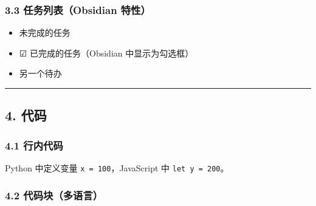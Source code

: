 \subsubsection{3.3 任务列表（Obsidian
特性）}\label{ux4efbux52a1ux5217ux8868obsidian-ux7279ux6027}

\begin{itemize}
\tightlist
\item[$\square$]
  未完成的任务
\item
  ☑ 已完成的任务（Obsidian 中显示为勾选框）
\item[$\square$]
  另一个待办
\end{itemize}

\begin{center}\rule{0.5\linewidth}{0.5pt}\end{center}

\subsection{4. 代码}\label{ux4ee3ux7801}

\subsubsection{4.1 行内代码}\label{ux884cux5185ux4ee3ux7801}

Python 中定义变量 \texttt{x\ =\ 100}，JavaScript 中
\texttt{let\ y\ =\ 200}。

\subsubsection{4.2
代码块（多语言）}\label{ux4ee3ux7801ux5757ux591aux8bedux8a00}

\begin{Shaded}
\begin{Highlighting}[]
    \OperatorTok{\textless{}=} \NormalTok{:}
    \OperatorTok{{-}}\NormalTok{) }\OperatorTok{+}\OperatorTok{{-}}\NormalTok{)}

\OperatorTok{=}\NormalTok{ [fibonacci(i) } \NormalTok{(}\NormalTok{)]}
\end{Highlighting}
\end{Shaded}

